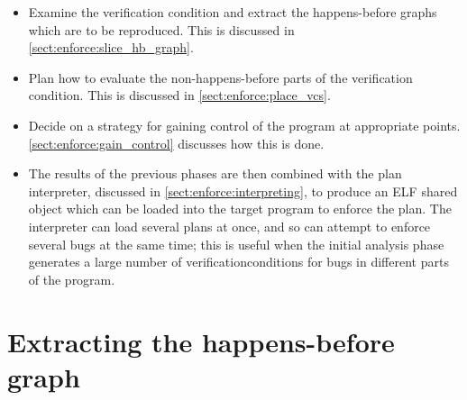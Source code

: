 \begin{itemize}
\item
  Examine the verification condition and extract the happens-before
  graphs which are to be reproduced.  This is discussed in
  \autoref{sect:enforce:slice_hb_graph}.
\item
  Plan how to evaluate the non-happens-before parts of the
  verification condition.  This is discussed in
  \autoref{sect:enforce:place_vcs}.
\item
  Decide on a strategy for gaining control of the program at
  appropriate points.  \autoref{sect:enforce:gain_control}
  discusses how this is done.
\item
  The results of the previous phases are then combined with the plan
  interpreter, discussed in \autoref{sect:enforce:interpreting},
  to produce an ELF shared object which can be loaded into the target
  program to enforce the plan.  The interpreter can load several plans
  at once, and so can attempt to enforce several bugs at the same
  time; this is useful when the initial analysis phase generates a
  large number of \glspl{verificationcondition} for bugs in different
  parts of the program.
\end{itemize}

\section{Extracting the happens-before graph}
\label{sect:enforce:slice_hb_graph}

